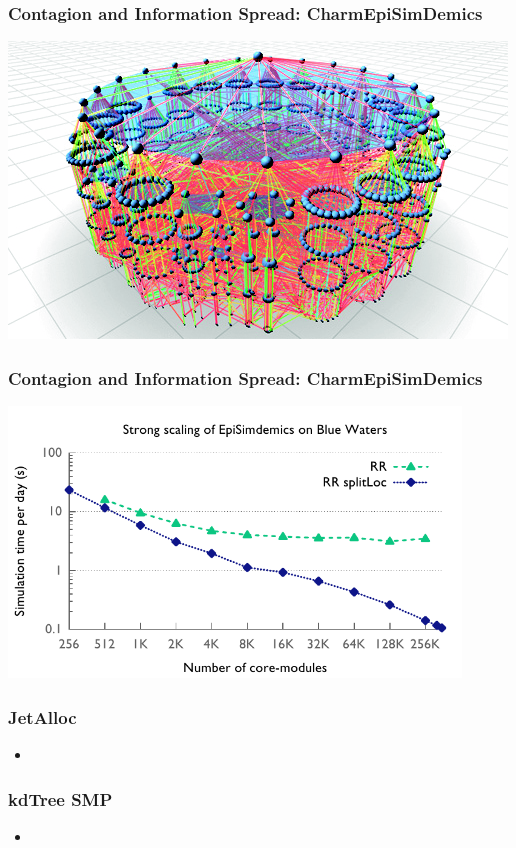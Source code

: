 \begin{frame}
\frametitle{Contagion and Information Spread: CharmEpiSimDemics}
\includegraphics[width=\textwidth]{../figures/contagion.png}
\end{frame}


\begin{frame}
\frametitle{Contagion and Information Spread: CharmEpiSimDemics}
\begin{center}
\includegraphics[width=0.9\textwidth]{../figures/simdemics_strong_scaling.pdf}
\end{center}
\end{frame}


\begin{frame}
\frametitle{JetAlloc}
%
\begin{itemize}
\item
\end{itemize}
%
\end{frame}

\begin{frame}
\frametitle{kdTree SMP}
\begin{itemize}
\item
\end{itemize}
%
\end{frame}

